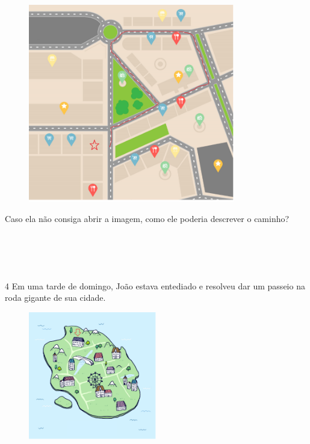 \begin{figure}[H]
\centering\includegraphics[width=3.55in,height=3.406in]{./imgSAEB_8_MAT/media/image37.png}
\end{figure}


Caso ela não consiga abrir a imagem, como ele poderia descrever o
caminho?

\\
\\
\\
\\

\num{4} Em uma tarde de domingo, João estava entediado e resolveu dar um
passeio na roda gigante de sua cidade.

\begin{figure}[H]
\centering\includegraphics[width=2.2in,height=2.2in]{./imgSAEB_8_MAT/media/image38.png}
\end{figure}

